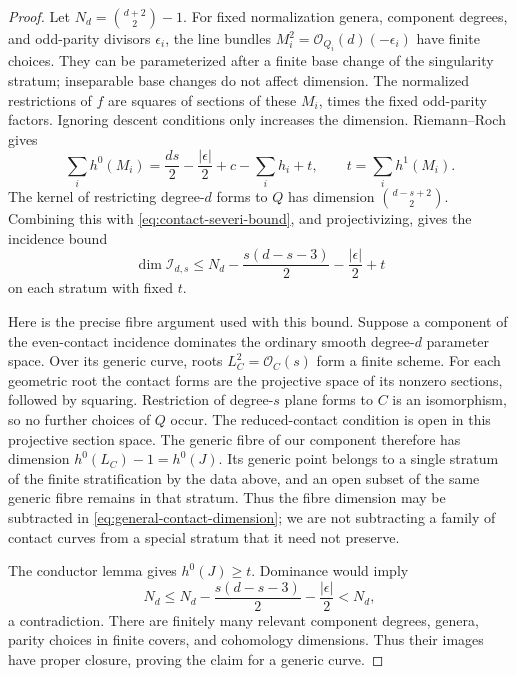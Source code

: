 \begin{proof}
Let $N_d=\binom{d+2}{2}-1$.
For fixed normalization genera, component degrees, and odd-parity
divisors $\epsilon_i$, the line bundles
$M_i^2=\mathcal O_{Q_i}(d)(-\epsilon_i)$ have finite choices.
They can be parameterized after a finite base change of the
singularity stratum; inseparable base changes do not affect
dimension.  The normalized restrictions of $f$ are squares of
sections of these $M_i$, times the fixed odd-parity factors.
Ignoring descent conditions only increases the dimension.
Riemann--Roch gives
\[
 \sum_i h^0(M_i)
 =\frac{ds}{2}-\frac{|\epsilon|}{2}
   +c-\sum_i h_i+t,
 \qquad t=\sum_i h^1(M_i).
\]
The kernel of restricting degree-$d$ forms to $Q$ has dimension
$\binom{d-s+2}{2}$.  Combining this with
\eqref{eq:contact-severi-bound}, and projectivizing, gives the
incidence bound
\begin{equation}\label{eq:general-contact-dimension}
 \dim\mathcal I_{d,s}
 \le N_d-\frac{s(d-s-3)}2-\frac{|\epsilon|}2+t
\end{equation}
on each stratum with fixed $t$.

Here is the precise fibre argument used with this bound.
Suppose a component of the even-contact incidence dominates the
ordinary smooth degree-$d$ parameter space.  Over its generic
curve, roots $L_C^2=\mathcal O_C(s)$ form a finite scheme.
For each geometric root the contact forms are the projective
space of its nonzero sections, followed by squaring.
Restriction of degree-$s$ plane forms to $C$ is an isomorphism,
so no further choices of $Q$ occur.  The reduced-contact condition
is open in this projective section space.  The generic fibre of
our component therefore has dimension
$h^0(L_C)-1=h^0(J)$.
Its generic point belongs to a single stratum of the finite
stratification by the data above, and an open subset of the same
generic fibre remains in that stratum.  Thus the fibre dimension
may be subtracted in \eqref{eq:general-contact-dimension}; we are
not subtracting a family of contact curves from a special stratum
that it need not preserve.

The conductor lemma gives $h^0(J)\ge t$.  Dominance would imply
\[
 N_d\le N_d-\frac{s(d-s-3)}2-\frac{|\epsilon|}2<N_d,
\]
a contradiction.  There are finitely many relevant component
degrees, genera, parity choices in finite covers, and cohomology
dimensions.  Thus their images have proper closure, proving the
claim for a generic curve.
\end{proof}

